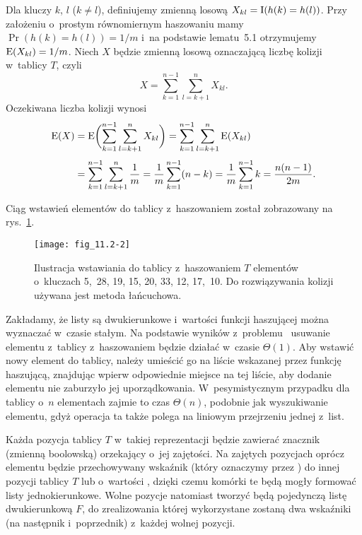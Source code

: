 \exercise %
Dla kluczy $k$, $l$ ($k\ne l$), definiujemy zmienną losową $X_{kl}=\operatorname{I}(h(k)=h(l))$.
Przy założeniu o~prostym równomiernym haszowaniu mamy $\Pr(h(k)=h(l))=1/m$ i~na podstawie lematu~5.1 otrzymujemy $\operatorname{E}(X_{kl})=1/m$.
Niech $X$ będzie zmienną losową oznaczającą liczbę kolizji w~tablicy $T$, czyli
\[
    X = \sum_{k=1}^{n-1}\sum_{l=k+1}^nX_{kl}.
\]
Oczekiwana liczba kolizji wynosi
\begin{align*}
	\operatorname{E}(X) &= \operatorname{E}\biggl(\sum_{k=1}^{n-1}\sum_{l=k+1}^nX_{kl}\biggr) = \sum_{k=1}^{n-1}\sum_{l=k+1}^n\operatorname{E}(X_{kl}) \\[1mm]
	&= \sum_{k=1}^{n-1}\sum_{l=k+1}^n\frac{1}{m} = \frac{1}{m}\sum_{k=1}^{n-1}(n-k) = \frac{1}{m}\sum_{k=1}^{n-1}k = \frac{n(n-1)}{2m}.
\end{align*}

\exercise %
Ciąg wstawień elementów do tablicy z~haszowaniem został zobrazowany na rys.~\ref{fig:11.2-2}.
\medskip
\begin{figure}[ht!]
	\begin{center}
		\texttt{[image: fig\_11.2-2]}
	\end{center}
	\caption{Ilustracja wstawiania do tablicy z~haszowaniem $T$ elementów o~kluczach 5,~28, 19, 15, 20, 33, 12, 17,~10.
Do rozwiązywania kolizji używana jest metoda łańcuchowa.} \label{fig:11.2-2}
\end{figure}

\exercise %
Zakładamy, że listy są dwukierunkowe i~wartości funkcji haszującej można wyznaczać w~czasie stałym.
Na podstawie wyników z~problemu~ usuwanie elementu z~tablicy z~haszowaniem będzie działać w~czasie $\Theta(1)$.
Aby wstawić nowy element do tablicy, należy umieścić go na liście wskazanej przez funkcję haszującą, znajdując wpierw odpowiednie miejsce na tej liście, aby dodanie elementu nie zaburzyło jej uporządkowania.
W~pesymistycznym przypadku dla tablicy o~$n$ elementach zajmie to czas $\Theta(n)$, podobnie jak wyszukiwanie elementu, gdyż operacja ta także polega na liniowym przejrzeniu jednej z~list.

\exercise %
Każda pozycja tablicy $T$ w~takiej reprezentacji będzie zawierać znacznik (zmienną boolowską) orzekający o~jej zajętości.
Na zajętych pozycjach oprócz elementu będzie przechowywany wskaźnik (który oznaczymy przez ) do innej pozycji tablicy $T$ lub o~wartości , dzięki czemu komórki te będą mogły formować listy jednokierunkowe.
Wolne pozycje natomiast tworzyć będą pojedynczą listę dwukierunkową $F$, do zrealizowania której wykorzystane zostaną dwa wskaźniki (na następnik i~poprzednik) z~każdej wolnej pozycji.

